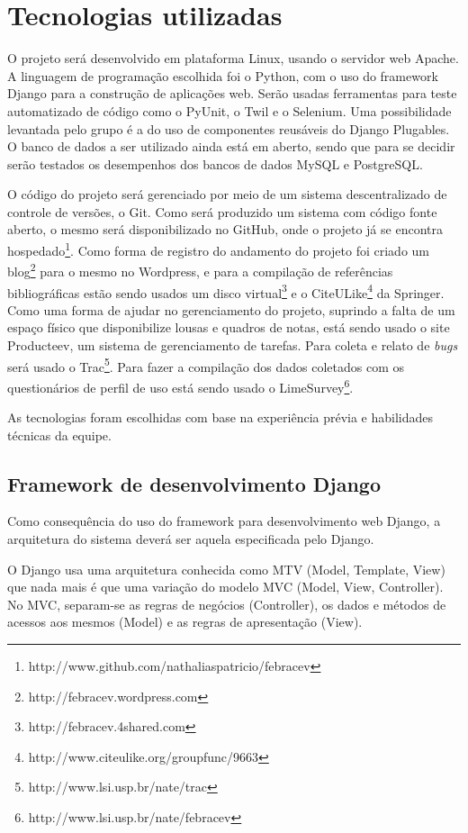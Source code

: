 \section{Tecnologias utilizadas}\label{tecnologias}

  O projeto será desenvolvido em plataforma Linux, usando o servidor web Apache. A linguagem de programação escolhida foi o Python, com o uso do framework Django para a construção de aplicações web. Serão usadas ferramentas para teste automatizado de código como o PyUnit, o Twil e o Selenium. Uma possibilidade levantada pelo grupo é a do uso de componentes reusáveis do Django Plugables. O banco de dados a ser utilizado ainda está em aberto, sendo que para se decidir serão testados os desempenhos dos bancos de dados MySQL e PostgreSQL.

  O código do projeto será gerenciado por meio de um sistema descentralizado de controle de versões, o Git. Como será produzido um sistema com código fonte aberto, o mesmo será disponibilizado no GitHub, onde o projeto já se encontra hospedado\footnote{http://www.github.com/nathaliaspatricio/febracev}. Como forma de registro do andamento do projeto foi criado um blog\footnote{http://febracev.wordpress.com} para o mesmo no Wordpress, e para a compilação de referências bibliográficas estão sendo usados um disco virtual\footnote{http://febracev.4shared.com} e o CiteULike\footnote{http://www.citeulike.org/groupfunc/9663} da Springer. Como uma forma de ajudar no gerenciamento do projeto, suprindo a falta de um espaço físico que disponibilize lousas e quadros de notas, está sendo usado o site Producteev, um sistema de gerenciamento de tarefas. Para coleta e relato de \textit{bugs} será usado o Trac\footnote{http://www.lsi.usp.br/nate/trac}. Para fazer a compilação dos dados coletados com os questionários de perfil de uso está sendo usado o LimeSurvey\footnote{http://www.lsi.usp.br/nate/febracev}.

  As tecnologias foram escolhidas com base na experiência prévia e habilidades técnicas da equipe.

  \subsection{Framework de desenvolvimento Django}

    Como consequência do uso do framework para desenvolvimento web Django, a arquitetura do sistema deverá ser aquela especificada pelo Django.

    O Django usa uma arquitetura conhecida como MTV (Model, Template, View) que nada mais é que uma variação do modelo MVC (Model, View, Controller). No MVC, separam-se as regras de negócios (Controller), os dados e métodos de acessos aos mesmos (Model) e as regras de apresentação (View).

